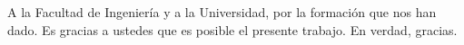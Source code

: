 \quote

A la Facultad de Ingeniería y a la Universidad, por la formación que nos han dado.
Es gracias a ustedes que es posible el presente trabajo.
En verdad, gracias.

\endquote
